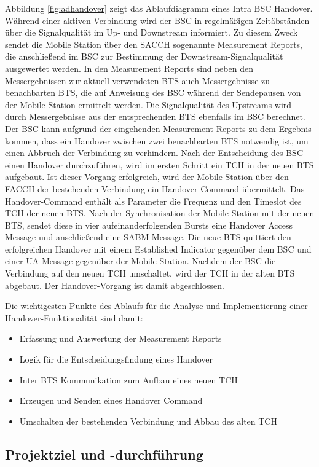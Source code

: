 Abbildung \ref{fig:adhandover} zeigt das Ablaufdiagramm eines Intra BSC Handover. Während einer aktiven Verbindung wird der BSC in regelmäßigen Zeitäbständen über die Signalqualität im Up- und Downstream informiert. Zu diesem Zweck sendet die Mobile Station über den SACCH sogenannte Measurement Reports, die anschließend im BSC zur Bestimmung der Downstream-Signalqualität ausgewertet werden. In den Measurement Reports sind neben den Messergebnissen zur aktuell verwendeten BTS auch Messergebnisse zu benachbarten BTS, die auf Anweisung des BSC während der Sendepausen von der Mobile Station ermittelt werden. Die Signalqualität des Upstreams wird durch Messergebnisse aus der entsprechenden BTS ebenfalls im BSC berechnet. Der BSC kann aufgrund der eingehenden Measurement Reports zu dem Ergebnis kommen, dass ein Handover zwischen zwei benachbarten BTS notwendig ist, um einen Abbruch der Verbindung zu verhindern. Nach der Entscheidung des BSC einen Handover durchzuführen, wird im ersten Schritt ein TCH in der neuen BTS aufgebaut. Ist dieser Vorgang erfolgreich, wird der Mobile Station über den FACCH der bestehenden Verbindung ein Handover-Command übermittelt. Das Handover-Command enthält als Parameter die Frequenz und den Timeslot des TCH der neuen BTS. Nach der Synchronisation der Mobile Station mit der neuen BTS, sendet diese in vier aufeinanderfolgenden Bursts eine Handover Access Message und anschließend eine SABM Message. Die neue BTS quittiert den erfolgreichen Handover mit einem Established Indicator gegenüber dem BSC und einer UA Message gegenüber der Mobile Station. Nachdem der BSC die Verbindung auf den neuen TCH umschaltet, wird der TCH in der alten BTS abgebaut. Der Handover-Vorgang ist damit abgeschlossen.

Die wichtigesten Punkte des Ablaufs für die Analyse und Implementierung einer Handover-Funktionalität sind damit:

\begin{itemize}
 \item Erfassung und Auswertung der Measurement Reports
 \item Logik für die Entscheidungsfindung eines Handover
 \item Inter BTS Kommunikation zum Aufbau eines neuen TCH
 \item Erzeugen und Senden eines Handover Command
 \item Umschalten der bestehenden Verbindung und Abbau des alten TCH
\end{itemize}

\subsection{Projektziel und -durchführung}

